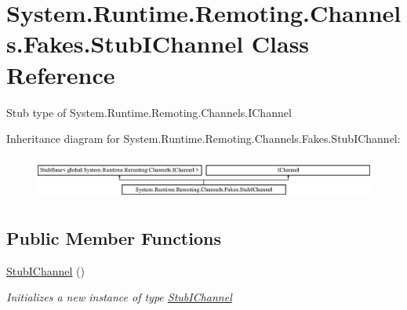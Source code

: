 \hypertarget{class_system_1_1_runtime_1_1_remoting_1_1_channels_1_1_fakes_1_1_stub_i_channel}{\section{System.\-Runtime.\-Remoting.\-Channels.\-Fakes.\-Stub\-I\-Channel Class Reference}
\label{class_system_1_1_runtime_1_1_remoting_1_1_channels_1_1_fakes_1_1_stub_i_channel}
}


Stub type of System.\-Runtime.\-Remoting.\-Channels.\-I\-Channel 


Inheritance diagram for System.\-Runtime.\-Remoting.\-Channels.\-Fakes.\-Stub\-I\-Channel\-:\begin{figure}[H]
\begin{center}
\leavevmode
\includegraphics[height=1.439589cm]{class_system_1_1_runtime_1_1_remoting_1_1_channels_1_1_fakes_1_1_stub_i_channel}
\end{center}
\end{figure}
\subsection*{Public Member Functions}
\begin{DoxyCompactItemize}
\item 
\hyperlink{class_system_1_1_runtime_1_1_remoting_1_1_channels_1_1_fakes_1_1_stub_i_channel_aeb4f786915daae377baa1719e46cdcbb}{Stub\-I\-Channel} ()
\begin{DoxyCompactList}\small\item\em Initializes a new instance of type \hyperlink{class_system_1_1_runtime_1_1_remoting_1_1_channels_1_1_fakes_1_1_stub_i_channel}{Stub\-I\-Channel}\end{DoxyCompactList}\end{DoxyCompactItemize}
